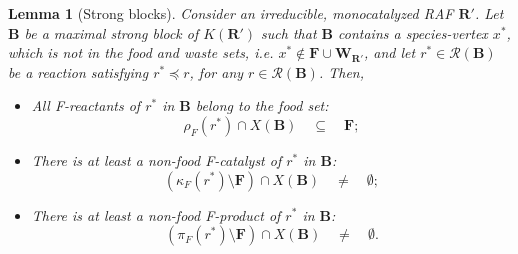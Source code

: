 \documentclass[pdflatex]{sn-jnl}
\theoremstyle{thmstyleone}%
\newtheorem{lemma}[theorem]{Lemma}%
\theoremstyle{examplesty}%
\theoremstyle{thmstylethree}%
\newcommand{\king}{K}
\newcommand{\food}{\ensuremath{\mathbf{F}}}
\newcommand{\RAF}[0]{\mathbf{R}'}
\newcommand{\block}[0]{\mathbf{B}}
\newcommand{\cat}{\kappa_F}
\newcommand{\feducts}{\rho_F}
\newcommand{\fproducts}{\pi_F}
\begin{document}
\vspace{6pt}
\begin{lemma}[Strong blocks]\label{lem:StrongBlocks}
  Consider an irreducible, monocatalyzed RAF $\RAF$. Let $\block$ be a
  maximal strong block of $\king(\RAF)$ such that $\block$ contains a
  species-vertex $x^*$, which is not in the food and waste sets,
  i.e. $x^*\notin \food \cup\mathbf{W}_{\RAF}$, and let
  $r^*\in \mathcal{R}(\block)$ be a reaction satisfying $r^* \preceq r$,
  for any $r\in \mathcal{R}(\block)$. Then,
  \begin{itemize}
  \item[i.] All F-reactants of $r^*$ in $\block$ belong to the food
    set:{$$\feducts(r^*)\cap X(\block) \quad \subseteq \quad \food;$$}
  \item[ii.] There is at least a non-food F-catalyst of $r^*$ in $\block$:
    $$(\cat(r^*) \setminus \food) \cap X(\block)\quad \neq \quad \emptyset;$$
  \item[iii.] There is at least a non-food F-product of $r^*$ in
    $\block$:$$(\fproducts(r^*) \setminus \food) \cap X(\block)\quad \neq
    \quad \emptyset.$$
  \end{itemize} 
\end{lemma}
\end{document}
